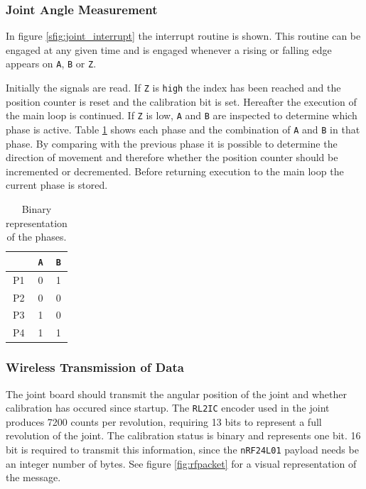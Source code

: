 \subsubsection{Joint Angle Measurement}
\label{ssub:joint_angle_measurement}
In figure \ref{sfig:joint_interrupt} the interrupt routine is shown.
This routine can be engaged at any given time and is engaged whenever a rising or falling edge appears on \texttt{A}, \texttt{B} or \texttt{Z}.

Initially the signals are read.
If \texttt{Z} is \texttt{high} the index has been reached and the position counter is reset and the calibration bit is set.
Hereafter the execution of the main loop is continued.
If \texttt{Z} is low, \texttt{A} and \texttt{B} are inspected to determine which phase is active.
Table \ref{tab:bin_phase} shows each phase and the combination of \texttt{A} and \texttt{B} in that phase.
By comparing with the previous phase it is possible to determine the direction of movement and therefore whether the position counter should be incremented or decremented.
Before returning execution to the main loop the current phase is stored. 

\begin{table}
	\centering
	\begin{tabular}{c | c  c}
		& \texttt{A} & \texttt{B}\\
		\hline
		P1 & 0 & 1\\
		P2 & 0 & 0\\
		P3 & 1 & 0\\
		P4 & 1 & 1
	\end{tabular}
	\caption{Binary representation of the phases.}
	\label{tab:bin_phase}
\end{table}

\subsubsection{Wireless Transmission of Data}
\label{ssub:wireless_transmission_of_data}
The joint board should transmit the angular position of the joint and whether calibration has occured since startup.
The \texttt{RL2IC} encoder used in the joint produces 7200 counts per revolution, requiring 13 bits to represent a full revolution of the joint.
The calibration status is binary and represents one bit. 
16 bit is required to transmit this information, since the \texttt{nRF24L01} payload needs be an integer number of bytes.
See figure \ref{fig:rfpacket} for a visual representation of the message.


